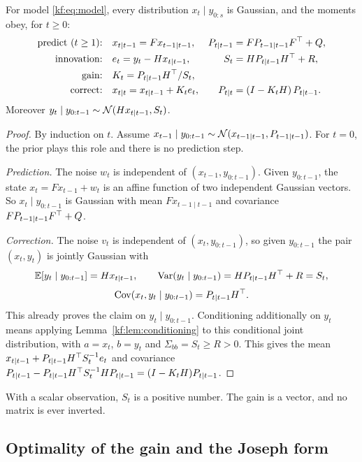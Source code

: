 \begin{theorem}\label{kf:thm:kalman}
For model \eqref{kf:eq:model}, every distribution $x_t\mid y_{0:s}$ is Gaussian, and the
moments obey, for $t\ge 0$:
\begin{align}
  \text{predict ($t\ge1$):}\quad & x_{t\mid t-1} = F x_{t-1\mid t-1}, &
     P_{t\mid t-1} &= F P_{t-1\mid t-1} F^\top + Q, \label{kf:eq:predict}\\
  \text{innovation:}\quad & e_t = y_t - H x_{t\mid t-1}, &
     S_t &= H P_{t\mid t-1} H^\top + R, \label{kf:eq:innovation}\\
  \text{gain:}\quad & K_t = P_{t\mid t-1} H^\top / S_t, \label{kf:eq:gain}\\
  \text{correct:}\quad & x_{t\mid t} = x_{t\mid t-1} + K_t e_t, &
     P_{t\mid t} &= (I-K_tH)\,P_{t\mid t-1}. \label{kf:eq:correct}
\end{align}
Moreover $y_t\mid y_{0:t-1}\sim\mathcal{N}(Hx_{t\mid t-1},S_t)$.
\end{theorem}
\begin{proof}
By induction on $t$. Assume $x_{t-1}\mid y_{0:t-1}\sim\mathcal{N}(x_{t-1\mid t-1},P_{t-1\mid t-1})$.
For $t=0$, the prior plays this role and there is no prediction step.

\emph{Prediction.} The noise $w_t$ is independent of $(x_{t-1},y_{0:t-1})$. Given
$y_{0:t-1}$, the state $x_t=Fx_{t-1}+w_t$ is an affine function of two
independent Gaussian vectors. So $x_t\mid y_{0:t-1}$ is Gaussian with mean
$Fx_{t-1\mid t-1}$ and covariance $FP_{t-1\mid t-1}F^\top+Q$.

\emph{Correction.} The noise $v_t$ is independent of $(x_t,y_{0:t-1})$, so given
$y_{0:t-1}$ the pair $(x_t,y_t)$ is jointly Gaussian with
\[
  \mathbb{E}[y_t\mid y_{0:t-1}] = Hx_{t\mid t-1},\qquad
  \operatorname{Var}(y_t\mid y_{0:t-1}) = HP_{t\mid t-1}H^\top+R = S_t,
\]
\[
  \operatorname{Cov}(x_t,y_t\mid y_{0:t-1}) = P_{t\mid t-1}H^\top .
\]
This already proves the claim on $y_t\mid y_{0:t-1}$. Conditioning
additionally on $y_t$ means applying Lemma~\ref{kf:lem:conditioning} to this
conditional joint distribution, with $a=x_t$, $b=y_t$ and $\Sigma_{bb}=S_t\ge R>0$.
This gives the mean $x_{t\mid t-1}+P_{t\mid t-1}H^\top S_t^{-1}e_t$ and covariance
$P_{t\mid t-1}-P_{t\mid t-1}H^\top S_t^{-1}HP_{t\mid t-1}=(I-K_tH)P_{t\mid t-1}$.
\end{proof}

With a scalar observation, $S_t$ is a positive number. The gain is a vector,
and no matrix is ever inverted.

\subsection{Optimality of the gain and the Joseph form}

